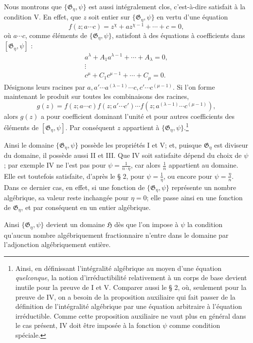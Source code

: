 Nous montrons que $\{\mathfrak G_\eta,\psi\}$ est aussi intégralement clos, c'est-à-dire satisfait à la condition V. En effet, que $z$ soit entier sur $\{\mathfrak G_\eta,\psi\}$ en vertu d'une équation
\[
 f(z;a\cdots c)=z^\chi+a z^{\chi-1}+\cdots+c=0,
\]
où $a\cdots c$, comme éléments de $\{\mathfrak G_\eta,\psi\}$, satisfont à des équations à coefficients dans $[\mathfrak G_\eta,\psi]$ :
\[
\begin{gathered}
 a^\lambda+A_1a^{\lambda-1}+\cdots+A_\lambda=0,\\
 \vdots\\
 c^\mu+C_1c^{\mu-1}+\cdots+C_\mu=0.
\end{gathered}
\]
Désignons leurs racines par $a,a'\cdots a^{(\lambda-1)}\cdots c,c'\cdots c^{(\mu-1)}$. Si l'on forme maintenant le produit sur toutes les combinaisons des racines,
\[
 g(z)=f(z;a\cdots c)f(z;a'\cdots c')\cdots
      f(z;a^{(\lambda-1)}\cdots c^{(\mu-1)}),
\]
alors $g(z)$ a pour coefficient dominant l'unité et pour autres coefficients des éléments de $[\mathfrak G_\eta,\psi]$. Par conséquent $z$ appartient à $\{\mathfrak G_\eta,\psi\}$.\footnote{Ainsi, en définissant l'intégralité algébrique au moyen d'une équation \emph{quelconque}, la notion d'irréductibilité relativement à un corps de base devient inutile pour la preuve de I et V. Comparer aussi le \S{} 2, où, seulement pour la preuve de IV, on a besoin de la proposition auxiliaire qui fait passer de la définition de l'intégralité algébrique par une équation arbitraire à l'équation irréductible. Comme cette proposition auxiliaire ne vaut plus en général dans le cas présent, IV doit être imposée à la fonction $\psi$ comme condition spéciale.}

Ainsi le domaine $\{\mathfrak G_\eta,\psi\}$ possède les propriétés I et V; et, puisque $\mathfrak G_\eta$ est diviseur du domaine, il possède aussi II et III. Que IV soit satisfaite dépend du choix de $\psi$; par exemple IV ne l'est pas pour $\psi=\frac{1}{n\cdot\eta}$, car alors $\frac1n$ appartient au domaine. Elle est toutefois satisfaite, d'après le \S{} 2, pour $\psi=\frac1\eta$, ou encore pour $\psi=\frac{\eta}{n}$. Dans ce dernier cas, en effet, si une fonction de $\{\mathfrak G_\eta,\psi\}$ représente un nombre algébrique, sa valeur reste inchangée pour $\eta=0$; elle passe ainsi en une fonction de $\mathfrak G_\eta$, et par conséquent en un entier algébrique.

Ainsi $\{\mathfrak G_\eta,\psi\}$ devient un domaine $\mathfrak H$ dès que l'on impose à $\psi$ la condition qu'aucun nombre algébriquement fractionnaire n'entre dans le domaine par l'adjonction algébriquement entière.


